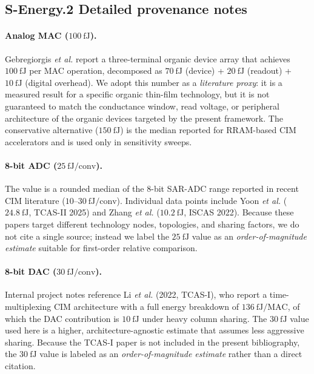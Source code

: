 \subsection*{S-Energy.2 Detailed provenance notes}

\paragraph{Analog MAC ($100~\text{fJ}$).}
Gebregiorgis \textit{et al.} \cite{gebregiorgis2023organiccim} report a three-terminal organic device array that achieves $100~\text{fJ}$ per MAC operation, decomposed as $70~\text{fJ}$ (device) + $20~\text{fJ}$ (readout) + $10~\text{fJ}$ (digital overhead).  We adopt this number as a \emph{literature proxy}: it is a measured result for a specific organic thin-film technology, but it is not guaranteed to match the conductance window, read voltage, or peripheral architecture of the organic devices targeted by the present framework.  The conservative alternative ($150~\text{fJ}$) is the median reported for RRAM-based CIM accelerators and is used only in sensitivity sweeps.

\paragraph{8-bit ADC ($25~\text{fJ/conv}$).}
The value is a rounded median of the $8$-bit SAR-ADC range reported in recent CIM literature ($10$--$30~\text{fJ/conv}$).  Individual data points include Yoon \textit{et al.} ($24.8~\text{fJ}$, TCAS-II 2025) and Zhang \textit{et al.} ($10.2~\text{fJ}$, ISCAS 2022).  Because these papers target different technology nodes, topologies, and sharing factors, we do not cite a single source; instead we label the $25~\text{fJ}$ value as an \emph{order-of-magnitude estimate} suitable for first-order relative comparison.

\paragraph{8-bit DAC ($30~\text{fJ/conv}$).}
Internal project notes reference Li \textit{et al.} (2022, TCAS-I), who report a time-multiplexing CIM architecture with a full energy breakdown of $136~\text{fJ/MAC}$, of which the DAC contribution is $10~\text{fJ}$ under heavy column sharing.  The $30~\text{fJ}$ value used here is a higher, architecture-agnostic estimate that assumes less aggressive sharing.  Because the TCAS-I paper is not included in the present bibliography, the $30~\text{fJ}$ value is labeled as an \emph{order-of-magnitude estimate} rather than a direct citation.

